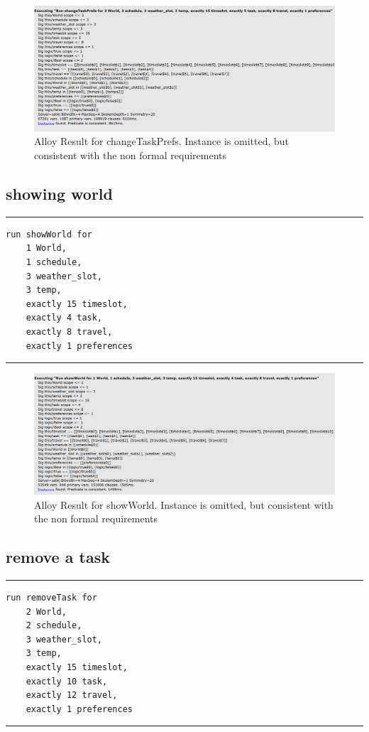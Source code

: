 \begin{figure}[H]
\centering
\includegraphics[scale=0.55]{Pictures/changeTaskPrefs.PNG}
\caption{Alloy Result for changeTaskPrefs. Instance is omitted, but
consistent with the non formal requirements}
\end{figure}

\subsection{showing world}
\rule{\textwidth}{0.4pt}
\begin{verbatim}
run showWorld for 
    1 World,
    1 schedule,
    3 weather_slot,
    3 temp, 
    exactly 15 timeslot,
    exactly 4 task, 
    exactly 8 travel,
    exactly 1 preferences 
\end{verbatim}    
\rule{\textwidth}{0.4pt}

\begin{figure}[H]
\centering
\includegraphics[scale=0.55]{Pictures/showWorld.PNG}
\caption{Alloy Result for showWorld. Instance is omitted, but
consistent with the non formal requirements}
\end{figure}

\subsection{remove a task}
\rule{\textwidth}{0.4pt}
\begin{verbatim}
run removeTask for 
    2 World,
    2 schedule,
    3 weather_slot,
    3 temp,
    exactly 15 timeslot,
    exactly 10 task,
    exactly 12 travel,
    exactly 1 preferences     
\end{verbatim}
\rule{\textwidth}{0.4pt}

